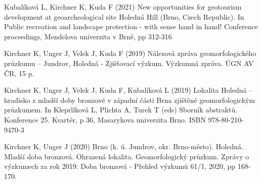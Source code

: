 {Kubalíková L, Kirchner K, Kuda F (2021) New opportunities for geotourism development at geoarcheological site Holedná Hill (Brno, Czech Republic). In Public recreation and landscape protection - with sense hand in hand! Conference proceedings, Mendelova univerzita v Brně, pp 312-316

Kirchner K, Unger J, Velek J, Kuda F (2019) Nálezová zpráva geomorfologického průzkumu – Jundrov, Holedná - Zjišťovací výzkum. Výzkumná zpráva. ÚGN AV ČR, 15 p.

Kirchner K, Unger J, Velek J, Kuda F, Kubalíková L (2019) Lokalita Holedná – hradisko z mladší doby bronzové v západní části Brna zjištěné geomorfologickým průzkumem. In Kleprlíková L, Plichta A, Turek T (eds) Sborník abstraktů. Konference 25. Kvartér, p 36, Masarykova univerzita Brno. ISBN 978-80-210-9470-3

Kirchner K, Unger J (2020) Brno (k. ú. Jundrov, okr. Brno-město). Holedná. Mladší doba bronzová. Ohrazená lokalita. Geomorfologický průzkum. Zprávy o výzkumech za rok 2019: Doba bronzová - Přehled výzkumů 61/1, 2020, pp 168-170.
}


